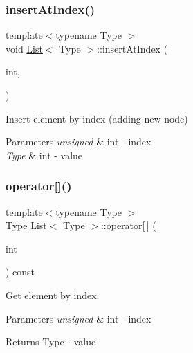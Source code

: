 \subsubsection{\texorpdfstring{insert\+At\+Index()}{insertAtIndex()}}
{\footnotesize\ttfamily template$<$typename Type $>$ \\
void \hyperlink{classList}{List}$<$ Type $>$\+::insert\+At\+Index (\begin{DoxyParamCaption}\item[{unsigned}]{int,  }\item[{Type}]{ }\end{DoxyParamCaption})}



Insert element by index (adding new node) 


\begin{DoxyParams}{Parameters}
{\em unsigned} & int -\/ index \\
\hline
{\em Type} & int -\/ value \\
\hline
\end{DoxyParams}
\mbox{\label{classList_a3898d41810652b70aa2e2089c39bfdde}} 
\subsubsection{\texorpdfstring{operator[]()}{operator[]()}}
{\footnotesize\ttfamily template$<$typename Type $>$ \\
Type \hyperlink{classList}{List}$<$ Type $>$\+::operator\mbox{[}$\,$\mbox{]} (\begin{DoxyParamCaption}\item[{unsigned}]{int }\end{DoxyParamCaption}) const}



Get element by index. 


\begin{DoxyParams}{Parameters}
{\em unsigned} & int -\/ index \\
\hline
\end{DoxyParams}
\begin{DoxyReturn}{Returns}
Type -\/ value 
\end{DoxyReturn}
\mbox{\label{classList_ad69aa8e4c38ee6a5bf07f8cdd5047bd1}} 
